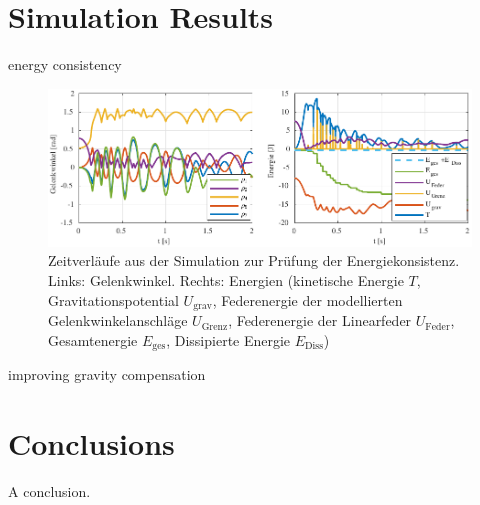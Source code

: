 \documentclass[letterpaper, 10 pt, conference]{ieeeconf}  %
\begin{document}
\section{Simulation Results}

energy consistency

\begin{figure}[tb!]
    \includegraphics{figures/KAS5m5_Gelenkgrenzmodell_q_E.pdf} 
    \caption[Zeitverläufe aus der Simulation zur Prüfung der Energiekonsistenz]{Zeitverläufe aus der Simulation zur Prüfung der Energiekonsistenz. Links: Gelenkwinkel. Rechts: Energien (kinetische Energie $T$, Gravitationspotential $U_\mathrm{grav}$, Federenergie der modellierten Gelenkwinkelanschläge $U_\mathrm{Grenz}$, Federenergie der Linearfeder $U_\mathrm{Feder}$, Gesamtenergie $E_\mathrm{ges}$, Dissipierte Energie $E_\mathrm{Diss}$)}
    \label{fig:SimulationEnergiekonsistenz}
\end{figure} 


improving gravity compensation

\section{Conclusions}

A conclusion.

\addtolength{\textheight}{-12cm}   %




\end{document}
